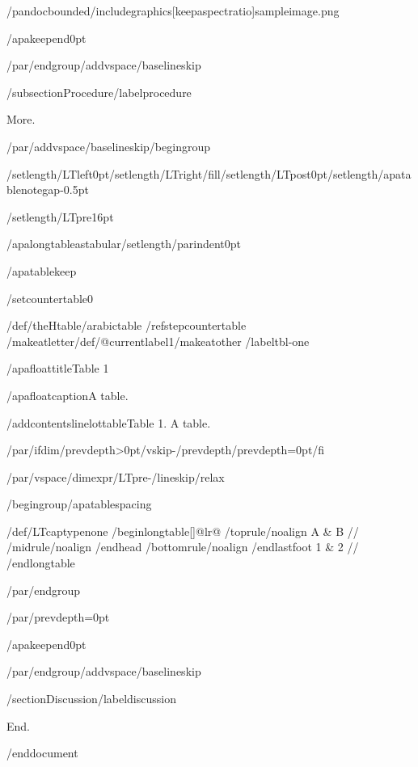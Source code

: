 /pandocbounded{/includegraphics[keepaspectratio]{sampleimage.png}}

/apakeepend{0pt}

/par/endgroup/addvspace{/baselineskip}

/subsection{Procedure}/label{procedure}

More.

/par/addvspace{/baselineskip}/begingroup

/setlength{/LTleft}{0pt}/setlength{/LTright}{/fill}/setlength{/LTpost}{0pt}/setlength{/apatablenotegap}{-0.5pt}

/setlength{/LTpre}{16pt}

/apalongtableastabular/setlength{/parindent}{0pt}

/apatablekeep

/setcounter{table}{0}

/def/theHtable{/arabic{table}}%
/refstepcounter{table}%
/makeatletter/def/@currentlabel{1}/makeatother%
/label{tbl-one}

/apafloattitle{Table 1}

/apafloatcaption{A table.}

/addcontentsline{lot}{table}{Table 1. A table.}

/par/ifdim/prevdepth>0pt/vskip-/prevdepth/prevdepth=0pt/fi

/par/vspace{/dimexpr/LTpre-/lineskip/relax}

/begingroup/apatablespacing

{/def/LTcaptype{none} %
/begin{longtable}[]{@{}lr@{}}
/toprule/noalign{}
A & B //
/midrule/noalign{}
/endhead
/bottomrule/noalign{}
/endlastfoot
1 & 2 //
/end{longtable}
}

/par/endgroup

/par/prevdepth=0pt

/apakeepend{0pt}

/par/endgroup/addvspace{/baselineskip}

/section{Discussion}/label{discussion}

End.




/end{document}
